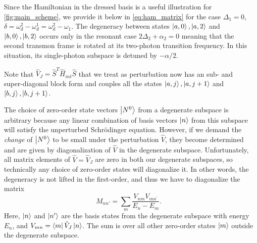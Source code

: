 \documentclass[%
 aps, prx,
 amsmath,amssymb,
 reprint,%
superscriptaddress
]{revtex4-2}
\begin{document}
Since the Hamiltonian in the dressed basis is a 
useful illustration for 
\autoref{fig:main_scheme}, we provide it below in 
\autoref{eq:ham_matrix} for the case $\Delta_1 = 
0$, $\delta = \omega_d^2 - 	\omega_d^1 = 
\omega_d^2 - \omega_1$. The degeneracy between 
states $\ket{a, 0}, \ket{a,2}$ and $\ket{b, 0}, 
\ket{b,2}$ occurs only in the resonant case 
$2\Delta_2   + \alpha_2 = 0$ meaning that the 
second transmon frame is rotated at its 
two-photon transition frequency. In this 
situation, its single-photon subspace is detuned 
by $-\alpha/2$.



Note that $\hat V_J = \hat S^T \hat H_{int} \hat 
S$ that we treat as perturbation now has an sub- 
and super-diagonal block form and couples all the 
states $\ket{a, j}, \ket{a,j+1}$ and $\ket{b, j}, 
\ket{b,j+1}$.



The choice of zero-order state vectors $\ket{N^0}$ from a degenerate subspace is arbitrary because any linear combination of basis vectors $\ket{n}$ from this subspace will satisfy the unperturbed Schrödinger equation. However, if we demand the \textit{change} of $\ket{N^0}$ to be small under the perturbation $\hat V$, they become determined and are given by diagonalization of $\hat V$ in the degenerate subspace. Unfortunately, all matrix elements of $\hat V = \hat V_J$ are zero in both our degenerate subspaces, so technically any choice of zero-order states will diagonalize it. In other words, the degeneracy is not lifted in the first-order, and thus we have to diagonalize the matrix \cite{landau2013quantum}
\begin{equation}
	M_{nn'} = \sum\limits_{m}\frac{V_{ nm}V_{mn^\prime}}{E_n-E_m}.
\end{equation}
Here, $\ket{n}$ and $\ket{n'}$ are the basis 
states from the degenerate subspace with energy 
$E_n$, and $V_{mn} = \bra{m} \hat  V_J \ket{n}$. 
The sum is over all other zero-order states 
$\ket{m}$ outside the degenerate subspace.
\end{document}
